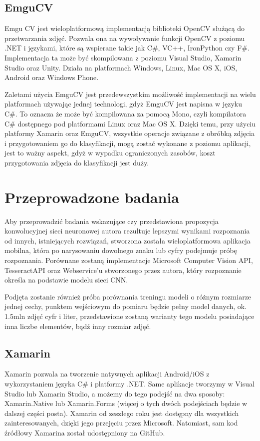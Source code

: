 \documentclass[brudnopis]{xmgr}
\begin{document}
\section{EmguCV}

Emgu CV jest wieloplatformową implementacją biblioteki OpenCV służącą do przetwarzania zdjęć. Pozwala ona na wywoływanie funkcji OpenCV z poziomu .NET i językami, które są wspierane takie jak C\#, VC++, IronPython czy F\#. Implementacja ta może być skompilowana z poziomu Visual Studio, Xamarin Studio oraz Unity. Działa na platformach Windows, Linux, Mac OS X, iOS, Android oraz Windows Phone.

Zaletami użycia EmguCV jest przedewszystkim możliwość implementacji na wielu platformach używając jednej technologi, gdyż EmguCV jest napisna w języku C\#. To oznacza że może być kompilowana za pomocą Mono, czyli kompilatora C\# dostępnego pod platformami Linux oraz Mac OS X. Dzięki temu, przy użyciu platformy Xamarin oraz EmguCV, wszystkie operacje związane z obróbką zdjęcia i przygotowaniem go do klasyfikacji, mogą zostać wykonane z poziomu aplikacji, jest to ważny aspekt, gdyż w wypadku ograniczonych zasobów, koszt przygotowania zdjęcia do klasyfikacji jest duży.

\chapter{Przeprowadzone badania}

Aby przeprowadzić badania wskazujące czy przedstawiona propozycja konwolucyjnej sieci neuronowej autora rezultuje lepszymi wynikami rozpoznania od innych, istniejących rozwiązań, stworzona została wieloplatformowa aplikacja mobilna, która po narysowaniu dowolnego znaku lub cyfry podejmuje próbę rozpoznania.
Porównane zostaną implementacje Microsoft Computer Vision API, TesseractAPI oraz Webservice'u stworzonego przez autora, który rozpoznanie określa na podstawie modelu sieci CNN.

Podjęta zostanie również próba porównania treningu modeli o różnym rozmiarze jednej cechy, punktem wejściowym do pomiaru będzie pełny model danych, ok. 1.5mln zdjęć cyfr i liter, przedstawione zostaną warianty tego modelu posiadające inna liczbe elementów, bądź inny rozmiar zdjęć.

\section{Xamarin}

Xamarin pozwala na tworzenie natywnych aplikacji Android/iOS z wykorzystaniem języka C\# i platformy .NET. Same aplikacje tworzymy w Visual Studio lub Xamarin Studio, a możemy do tego podejść na dwa sposoby: Xamarin.Native lub Xamarin.Forms (więcej o tych dwóch podejściach będzie w dalszej części posta). Xamarin od zeszłego roku jest dostępny dla wszystkich zainteresowanych, dzięki jego przejęciu przez Microsoft. Natomiast, sam kod źródłowy Xamarina został udostępniony na GitHub.
\end{document}
